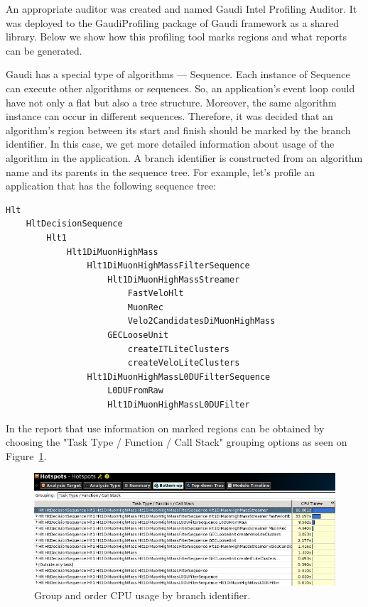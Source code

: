 \documentclass[a4paper]{jpconf}
\begin{document}
An appropriate auditor was created and named Gaudi Intel Profiling Auditor. It was deployed to the GaudiProfiling 
package of Gaudi framework as a shared library. Below we show how this profiling tool marks regions and what reports 
can be generated.

Gaudi has a special type of algorithms --- Sequence. Each instance of Sequence can execute other algorithms or 
sequences. So, an application's event loop could have not only a flat but also a tree structure. Moreover, the same 
algorithm instance can occur in different sequences. Therefore, it was decided that an algorithm's region between its start 
and finish should be marked by the branch identifier. In this case, we get more detailed information about usage of 
the algorithm in the application. A branch identifier is constructed from an algorithm name and its parents 
in the sequence tree. For example, let's profile an application that has the following sequence tree:
\begin{verbatim}
Hlt 
    HltDecisionSequence 
        Hlt1 
            Hlt1DiMuonHighMass
                Hlt1DiMuonHighMassFilterSequence
                    Hlt1DiMuonHighMassStreamer
                        FastVeloHlt
                        MuonRec
                        Velo2CandidatesDiMuonHighMass
                    GECLooseUnit
                        createITLiteClusters
                        createVeloLiteClusters
                Hlt1DiMuonHighMassL0DUFilterSequence
                    L0DUFromRaw
                    Hlt1DiMuonHighMassL0DUFilter
\end{verbatim}

In \amp the report that use information on marked regions can be obtained by choosing the 
"Task Type / Function / Call Stack" grouping options as seen on Figure~\ref{fig08}.

\begin{figure}[H]
\begin{minipage}{\textwidth}
\includegraphics[width=\textwidth]{figs/fig08.png}
\caption{\label{fig08}Group and order CPU usage by branch identifier.}
\end{minipage}
\end{figure}
\end{document}
